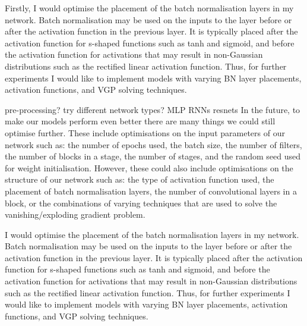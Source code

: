 {{Firstly, I would optimise the placement of the batch normalisation layers in my network. Batch normalisation may be used on the inputs to the layer before or after the activation function in the previous layer. It is typically placed after the activation function for s-shaped functions such as tanh and sigmoid, and before the activation function for activations that may result in non-Gaussian distributions such as the rectified linear activation function. Thus, for further experiments I would like to implement models with varying BN layer placements, activation functions, and VGP solving techniques.

pre-processing?
try different network types? MLP RNNs resnets
In the future, to make our models perform even better there are many things we could still optimise further. These include optimisations on the input parameters of our network such as: the number of epochs used, the batch size, the number of filters, the number of blocks in a stage, the number of stages, and the random seed used for weight initialisation. However, these could also include optimisations on the structure of our network such as: the type of activation function used, the placement of batch normalisation layers, the number of convolutional layers in a block, or the combinations of varying techniques that are used to solve the vanishing/exploding gradient problem.

I would optimise the placement of the batch normalisation layers in my network. Batch normalisation may be used on the inputs to the layer before or after the activation function in the previous layer. It is typically placed after the activation function for s-shaped functions such as tanh and sigmoid, and before the activation function for activations that may result in non-Gaussian distributions such as the rectified linear activation function. Thus, for further experiments I would like to implement models with varying BN layer placements, activation functions, and VGP solving techniques.







}
}

